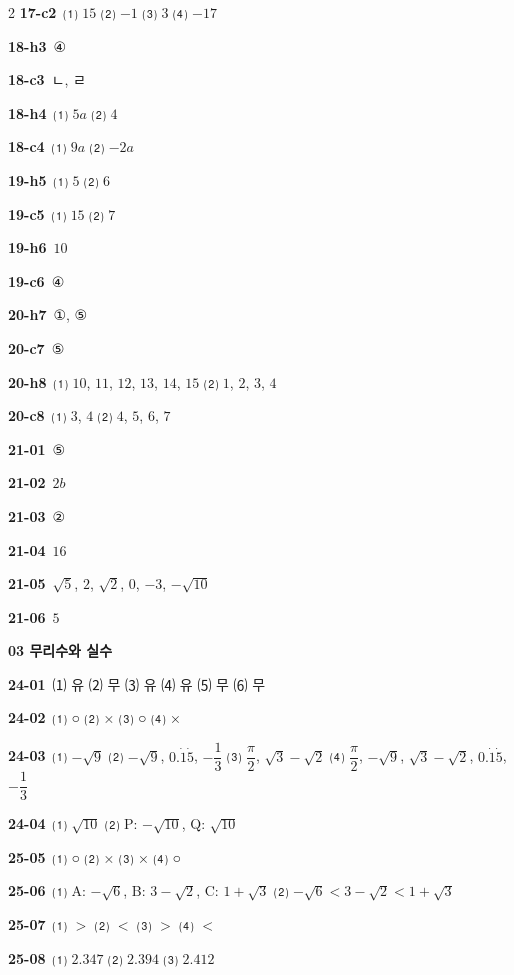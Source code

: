 \documentclass[10pt,a4paper]{article}
\begin{document}
\begin{multicols}{2}
\noindent\textbf{17-c2}\ ⑴ $15$ ⑵ $-1$ ⑶ $3$ ⑷ $-17$\par
\noindent\textbf{18-h3}\ ④\par
\noindent\textbf{18-c3}\ ㄴ, ㄹ\par
\noindent\textbf{18-h4}\ ⑴ $5a$ ⑵ $4$\par
\noindent\textbf{18-c4}\ ⑴ $9a$ ⑵ $-2a$\par
\noindent\textbf{19-h5}\ ⑴ $5$ ⑵ $6$\par
\noindent\textbf{19-c5}\ ⑴ $15$ ⑵ $7$\par
\noindent\textbf{19-h6}\ $10$\par
\noindent\textbf{19-c6}\ ④\par
\noindent\textbf{20-h7}\ ①, ⑤\par
\noindent\textbf{20-c7}\ ⑤\par
\noindent\textbf{20-h8}\ ⑴ $10$, $11$, $12$, $13$, $14$, $15$ ⑵ $1$, $2$, $3$, $4$\par
\noindent\textbf{20-c8}\ ⑴ $3$, $4$ ⑵ $4$, $5$, $6$, $7$\par
\noindent\textbf{21-01}\ ⑤\par
\noindent\textbf{21-02}\ $2b$\par
\noindent\textbf{21-03}\ ②\par
\noindent\textbf{21-04}\ $16$\par
\noindent\textbf{21-05}\ $\sqrt{5}$, $2$, $\sqrt{2}$, $0$, $-3$, $-\sqrt{10}$\par
\noindent\textbf{21-06}\ $5$\par
\noindent\textbf{03 무리수와 실수}\par\smallskip
\noindent\textbf{24-01}\ ⑴ 유 ⑵ 무 ⑶ 유 ⑷ 유 ⑸ 무 ⑹ 무\par
\noindent\textbf{24-02}\ ⑴ ○ ⑵ × ⑶ ○ ⑷ ×\par
\noindent\textbf{24-03}\ ⑴ $-\sqrt{9}$ ⑵ $-\sqrt{9}$, $0.\dot{1}\dot{5}$, $-\dfrac{1}{3}$ ⑶ $\dfrac{\pi}{2}$, $\sqrt{3}-\sqrt{2}$ ⑷ $\dfrac{\pi}{2}$, $-\sqrt{9}$, $\sqrt{3}-\sqrt{2}$, $0.\dot{1}\dot{5}$, $-\dfrac{1}{3}$\par
\noindent\textbf{24-04}\ ⑴ $\sqrt{10}$ ⑵ P: $-\sqrt{10}$, Q: $\sqrt{10}$\par
\noindent\textbf{25-05}\ ⑴ ○ ⑵ × ⑶ × ⑷ ○\par
\noindent\textbf{25-06}\ ⑴ A: $-\sqrt{6}$, B: $3-\sqrt{2}$, C: $1+\sqrt{3}$ ⑵ $-\sqrt{6}<3-\sqrt{2}<1+\sqrt{3}$\par
\noindent\textbf{25-07}\ ⑴ $>$ ⑵ $<$ ⑶ $>$ ⑷ $<$\par
\noindent\textbf{25-08}\ ⑴ $2.347$ ⑵ $2.394$ ⑶ $2.412$\par

\end{multicols}
\end{document}
